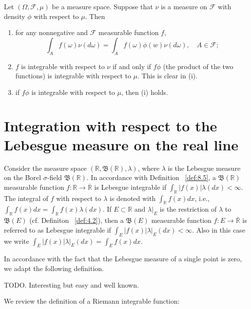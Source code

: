 \begin{proposition}[]
    \label{prop:9.3}
    Let $(\Omega, \mathcal{F}, \mu)$ be a measure space. Suppose that $\nu$ is a measure on
    $\mathcal{F}$ with density $\phi$ with respect to $\mu$. Then
    \begin{enumerate}[label=(\roman*)]
        \item for any nonnegative and $\mathcal{F}$ measurable function $f$,
            \[
            \int_{A} f(\omega)\nu(d\omega) = \int_{A} f(\omega)\phi(w)\nu(d\omega), \quad
            A \in \mathcal{F};
            \] 
        \item $f$ is integrable with respect to $\nu$ if and only if $f \phi$ (the product
            of the two functions) is integrable with respect to $\mu$. This is clear in (i).
        \item if $f \phi$ is integrable with respect to $\mu$, then (i) holds.
    \end{enumerate}
\end{proposition}

\section{Integration with respect to the Lebesgue measure on the real line}%
\label{sec:Integration with respect to the Lebesgue measure on the real line}

\begin{definition}[]
    \label{def:9.3}
    Consider the measure space $(\mathbb{R}, \mathfrak{B}(\mathbb{R}), \lambda)$, where $\lambda$
    is the Lebesgue measure on the Borel $\sigma$-field $\mathfrak{B}(\mathbb{R})$. In accordance
    with Definition ~\ref{def:8.5}, a $\mathfrak{B}(\mathbb{R})$ measurable function
    $f: \mathbb{R} \to \overline{\mathbb{R}}$ is Lebesgue integrable if
    $\int_{\mathbb{R}} |f(x)| \lambda(dx) < \infty$. The integral of $f$ with respect to $\lambda$
    is denoted with $\int_{\mathbb{R}}f(x)dx$, i.e., $\int_{\mathbb{R}} f(x)dx = 
    \int_{\mathbb{R}} f(x)\lambda(dx)$. If $E \subset \mathbb{R}$ and $\lambda|_E$ is the
    restriction of $\lambda$ to $\mathfrak{B}(E)$ (cf. Definiton ~\ref{def:4.2}), then a 
    $\mathfrak{B}(E)$ measurable function $f: E \to \overline{\mathbb{R}}$ is referred to as 
    Lebesgue integrable if $\int_{E} |f(x)| \lambda|_E (dx) < \infty$. Also in this case we write
    $\int_{E} |f(x)| \lambda|_E (dx) = \int_{E} f(x)dx$.
\end{definition}

In accordance with the fact that the Lebesgue measure of a single point is zero, we adapt the
following definition.

\begin{definition}[]
    \label{def:9.4}
    TODO. Interesting but easy and well known.
\end{definition}

We review the definition of a Riemann integrable function:

\begin{definition}[title]
    \label{def:title}
    
\end{definition}


